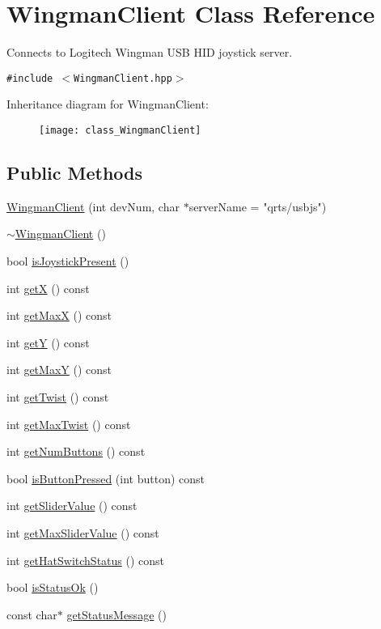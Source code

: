 \hypertarget{class_WingmanClient}{
\section{Wingman\-Client  Class Reference}
\label{class_WingmanClient}
}
Connects to Logitech Wingman USB HID joystick server. 


{\tt \#include $<$Wingman\-Client.hpp$>$}

Inheritance diagram for Wingman\-Client:\begin{figure}[H]
\begin{center}
\leavevmode
\texttt{[image: class\_WingmanClient]}
\end{center}
\end{figure}
\subsection*{Public Methods}
\begin{CompactItemize}
\item 
\hyperlink{class_WingmanClient_a0}{Wingman\-Client} (int dev\-Num, char $\ast$server\-Name = "qrts/usbjs")
\item 
\hyperlink{class_WingmanClient_a1}{$\sim$Wingman\-Client} ()
\item 
bool \hyperlink{class_WingmanClient_a2}{is\-Joystick\-Present} ()
\item 
int \hyperlink{class_WingmanClient_a3}{get\-X} () const
\item 
int \hyperlink{class_WingmanClient_a4}{get\-Max\-X} () const
\item 
int \hyperlink{class_WingmanClient_a5}{get\-Y} () const
\item 
int \hyperlink{class_WingmanClient_a6}{get\-Max\-Y} () const
\item 
int \hyperlink{class_WingmanClient_a7}{get\-Twist} () const
\item 
int \hyperlink{class_WingmanClient_a8}{get\-Max\-Twist} () const
\item 
int \hyperlink{class_WingmanClient_a9}{get\-Num\-Buttons} () const
\item 
bool \hyperlink{class_WingmanClient_a10}{is\-Button\-Pressed} (int button) const
\item 
int \hyperlink{class_WingmanClient_a11}{get\-Slider\-Value} () const
\item 
int \hyperlink{class_WingmanClient_a12}{get\-Max\-Slider\-Value} () const
\item 
int \hyperlink{class_WingmanClient_a13}{get\-Hat\-Switch\-Status} () const
\item 
bool \hyperlink{class_WingmanClient_a14}{is\-Status\-Ok} ()
\item 
const char$\ast$ \hyperlink{class_WingmanClient_a15}{get\-Status\-Message} ()
\end{CompactItemize}


